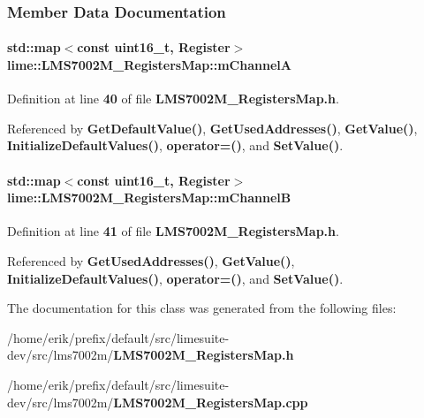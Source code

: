\subsubsection{Member Data Documentation}
\paragraph[{m\+ChannelA}]{\setlength{\rightskip}{0pt plus 5cm}std\+::map$<$const uint16\+\_\+t, {\bf Register}$>$ lime\+::\+L\+M\+S7002\+M\+\_\+\+Registers\+Map\+::m\+ChannelA\hspace{0.3cm}{\ttfamily [protected]}}\label{classlime_1_1LMS7002M__RegistersMap_a3f967155198b48374f0a035765c258ea}


Definition at line {\bf 40} of file {\bf L\+M\+S7002\+M\+\_\+\+Registers\+Map.\+h}.



Referenced by {\bf Get\+Default\+Value()}, {\bf Get\+Used\+Addresses()}, {\bf Get\+Value()}, {\bf Initialize\+Default\+Values()}, {\bf operator=()}, and {\bf Set\+Value()}.

\paragraph[{m\+ChannelB}]{\setlength{\rightskip}{0pt plus 5cm}std\+::map$<$const uint16\+\_\+t, {\bf Register}$>$ lime\+::\+L\+M\+S7002\+M\+\_\+\+Registers\+Map\+::m\+ChannelB\hspace{0.3cm}{\ttfamily [protected]}}\label{classlime_1_1LMS7002M__RegistersMap_a28f3d5c904bfe2efcb069fe530b614ce}


Definition at line {\bf 41} of file {\bf L\+M\+S7002\+M\+\_\+\+Registers\+Map.\+h}.



Referenced by {\bf Get\+Used\+Addresses()}, {\bf Get\+Value()}, {\bf Initialize\+Default\+Values()}, {\bf operator=()}, and {\bf Set\+Value()}.



The documentation for this class was generated from the following files\+:\begin{DoxyCompactItemize}
\item 
/home/erik/prefix/default/src/limesuite-\/dev/src/lms7002m/{\bf L\+M\+S7002\+M\+\_\+\+Registers\+Map.\+h}\item 
/home/erik/prefix/default/src/limesuite-\/dev/src/lms7002m/{\bf L\+M\+S7002\+M\+\_\+\+Registers\+Map.\+cpp}\end{DoxyCompactItemize}
